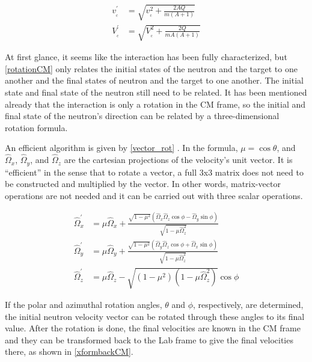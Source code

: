 \begin{equation}
\begin{split}
v_{_\mathrm{c}}^{\prime} &=  \sqrt{ v_{_\mathrm{c}}^{2} + \frac{2AQ}{m(A+1)}  }  \\
V_{_\mathrm{c}}^{\prime} &= \sqrt{ V_{_\mathrm{c}}^{2} + \frac{2Q}{mA(A+1)}  } 
\end{split}
\label{finalvCM}
\end{equation}

At first glance, it seems like the interaction has been fully characterized, but \eqref{rotationCM} only relates the initial states of the neutron and the target to one another and the final states of neutron and the target to one another.  The initial state and final state of the neutron still need to be related.  It has been mentioned already that the interaction is only a rotation in the CM frame, so the initial and final state of the neutron's direction can be related by a three-dimensional rotation formula.  

An efficient algorithm is given by \eqref{vector_rot} \cite{openmc}.  In the formula, $\mu=\cos \theta$, and $\hat{{\Omega}}_x$, $\hat{\Omega}_y$, and $\hat{\Omega}_z$ are the cartesian projections of the velocity's unit vector.  It is ``efficient'' in the sense that to rotate a vector, a full 3x3 matrix does not need to be constructed and multiplied by the vector. In other words, matrix-vector operations are not needed and it can be carried out with three scalar operations.

\begin{equation}
\begin{split}
\hat{\Omega}_x^{\prime} &= \mu \hat{\Omega}_x + \frac{\sqrt{1-\mu^2} (\hat{\Omega}_x \hat{\Omega}_z \cos \phi - \hat{\Omega}_y \sin \phi)}{ \sqrt{1-\mu \hat{\Omega}_z^2}} \\
\hat{\Omega}_y^{\prime} &= \mu \hat{\Omega}_y + \frac{\sqrt{1-\mu^2} (\hat{\Omega}_y \hat{\Omega}_z \cos \phi + \hat{\Omega}_x \sin \phi)}{ \sqrt{1-\mu \hat{\Omega}_z^2}} \\
\hat{\Omega}_z^{\prime} &= \mu \hat{\Omega}_z - \sqrt{ (1-\mu^2) (1-\mu \hat{\Omega}_z^2) }  \cos \phi 
\end{split}
\label{vector_rot}
\end{equation}

If the polar and azimuthal rotation angles, $\theta$ and $\phi$, respectively, are determined, the initial neutron velocity vector can be rotated through these angles to its final value.  After the rotation is done, the final velocities are known in the CM frame and they can be transformed back to the Lab frame to give the final velocities there, as shown in \eqref{xformbackCM}.

